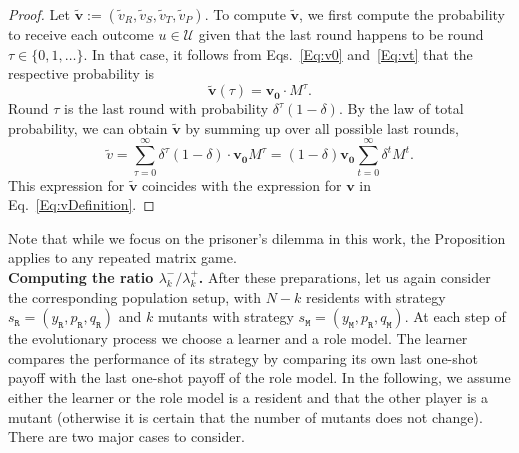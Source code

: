 \documentclass[11pt]{article}
\def\resident{\texttt{R}}
\def\mutant{\texttt{M}}
\def\strategy{s}
\theoremstyle{plainCl1}
\theoremstyle{plainCl2}
\begin{document}
\begin{proof}
Let $\mathbf{\tilde{v}}:=(\tilde{v}_R, \tilde{v}_S, \tilde{v}_T, \tilde{v}_P)$. 
To compute $\mathbf{\tilde{v}}$, we first compute the probability to receive each outcome $u\!\in\!\mathcal{U}$ given that the last round happens to be round $\tau\!\in\!\{0,1,\ldots\}$. 
In that case, it follows from Eqs.~\eqref{Eq:v0} and~\eqref{Eq:vt} that the respective probability is
\begin{equation} \label{Eq:vTildeSimple}
\mathbf{\tilde v}(\tau) = \mathbf{v_0}\cdot M^\tau.
\end{equation}
Round $\tau$ is the last round with probability $\delta^\tau(1\!-\!\delta)$. 
By the law of total probability, we can obtain $\mathbf{\tilde{v}}$ by summing up over all possible last rounds,
\begin{equation}
\tilde{v} = \sum_{\tau=0}^\infty \delta^\tau(1\!-\!\delta)  \cdot \mathbf{v_0}M^\tau 
=  (1\!-\!\delta)\mathbf{v_0} \sum_{t=0}^\infty \delta^t  M^t. 
\end{equation}
This expression for $\mathbf{\tilde{v}}$ coincides with the expression for $\mathbf{v}$ in Eq.~\eqref{Eq:vDefinition}.
\end{proof}

\noindent
Note that while we focus on the prisoner's dilemma in this work, the Proposition applies to any repeated matrix game.\\


\noindent
{\bf Computing the ratio $\lambda^-_k/\lambda^+_k$.}
After these preparations, let us again consider the corresponding population setup, with $N\!-\!k$ residents with strategy  \(\strategy_\resident = (y_\resident, p_\resident, q_\resident)\) and $k$ mutants with strategy  \(\strategy_\mutant = (y_\mutant, p_\resident, q_\mutant)\).
At each step of the evolutionary process we choose a learner and a role model. 
The learner compares the performance of its strategy by comparing its own last one-shot payoff with the last one-shot payoff of the role model. 
In the following, we assume either the learner or the role model is a resident and that the other player is a mutant (otherwise it is certain that the number of mutants does not change). 
There are two major cases to consider. 

\end{document}
